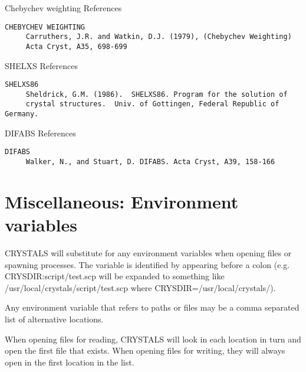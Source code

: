 \documentclass[10pt,a4paper]{report}
\begin{document}
 Chebychev weighting References
\small\begin{verbatim}
CHEBYCHEV WEIGHTING
     Carruthers, J.R. and Watkin, D.J. (1979), (Chebychev Weighting)
     Acta Cryst, A35, 698-699
\end{verbatim}\normalsize




 SHELXS References
\small\begin{verbatim}
SHELXS86
     Sheldrick, G.M. (1986).  SHELXS86. Program for the solution of
     crystal structures.  Univ. of Gottingen, Federal Republic of Germany.
\end{verbatim}\normalsize




 DIFABS References
\small\begin{verbatim}
DIFABS
     Walker, N., and Stuart, D. DIFABS. Acta Cryst, A39, 158-166
\end{verbatim}\normalsize


\section{Miscellaneous: Environment variables}


 CRYSTALS will substitute for any environment variables when
 opening files or spawning processes. The variable is identified by
 appearing before a colon (e.g. CRYSDIR:script/test.scp will be
 expanded to something like /usr/local/crystals/script/test.scp
 where CRYSDIR=/usr/local/crystals/).



 Any environment variable that refers to paths or files may be a comma 
 separated list of alternative locations.


 
 When opening files for reading, CRYSTALS will look in each location in
 turn and open the first file that exists. When opening files for 
 writing, they will always open in the first location in the list.



\printindex
\end{document}
